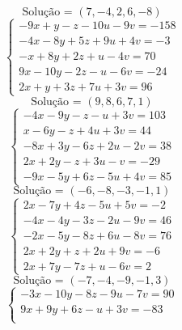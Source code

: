 \documentclass[12pt,oneside,a4paper,fleqn]{article}
\begin{document}
\begin{multicols*}{2}
\begin{equation*}
\end{equation*}
\begin{equation*}
\text{Solução = }\left(7,-4,2,6,-8\right)
\end{equation*}
\vspace{\baselineskip}
\begin{equation*}
\begin{cases}
-9x+y-z-10u-9v=-158 \\
-4x-8y+5z+9u+4v=-3 \\
-x+8y+2z+u-4v=70 \\
9x-10y-2z-u-6v=-24 \\
2x+y+3z+7u+3v=96
\end{cases}
\end{equation*}
\begin{equation*}
\text{Solução = }\left(9,8,6,7,1\right)
\end{equation*}
\vspace{\baselineskip}
\begin{equation*}
\begin{cases}
-4x-9y-z-u+3v=103 \\
x-6y-z+4u+3v=44 \\
-8x+3y-6z+2u-2v=38 \\
2x+2y-z+3u-v=-29 \\
-9x-5y+6z-5u+4v=85
\end{cases}
\end{equation*}
\begin{equation*}
\text{Solução = }\left(-6,-8,-3,-1,1\right)
\end{equation*}
\vspace{\baselineskip}
\begin{equation*}
\begin{cases}
2x-7y+4z-5u+5v=-2 \\
-4x-4y-3z-2u-9v=46 \\
-2x-5y-8z+6u-8v=76 \\
2x+2y+z+2u+9v=-6 \\
2x+7y-7z+u-6v=2
\end{cases}
\end{equation*}
\begin{equation*}
\text{Solução = }\left(-7,-4,-9,-1,3\right)
\end{equation*}
\vspace{\baselineskip}
\begin{equation*}
\begin{cases}
-3x-10y-8z-9u-7v=90 \\
9x+9y+6z-u+3v=-83 \\

\end{cases}
\end{equation*}
\end{multicols*}
\end{document}
